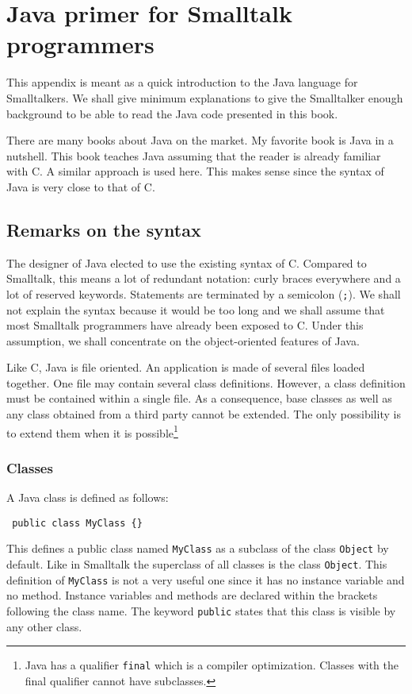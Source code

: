 \documentclass[twoside]{book}
\begin{document}
\fi

\chapter{Java primer for Smalltalk programmers}
\label{ch:javaprimer} This appendix is meant as a quick
introduction to the Java language for Smalltalkers. We shall give
minimum explanations to give the Smalltalker enough background to
be able to read the Java code presented in this book.

There are many books about Java on the market. My favorite book is
Java in a nutshell\cite{Java}. This book teaches Java assuming
that the reader is already familiar with C. A similar approach is
used here. This makes sense since the syntax of Java is very close
to that of C.

\section{Remarks on the syntax}
The designer of Java elected to use the existing syntax of C.
Compared to Smalltalk, this means a lot of redundant notation:
curly braces everywhere and a lot of reserved keywords. Statements
are terminated by a semicolon ({\tt ;}). We shall not explain the
syntax because it would be too long and we shall assume that most
Smalltalk programmers have already been exposed to C. Under this
assumption, we shall concentrate on the object-oriented features
of Java.

Like C, Java is file oriented.  An application is made of several
files loaded together. One file may contain several class
definitions. However, a class definition must be contained within
a single file. As a consequence, base classes as well as any class
obtained from a third party cannot be extended. The only
possibility is to extend them when it is possible\footnote{Java
has a qualifier {\tt final} which is a compiler optimization.
Classes with the final qualifier cannot have subclasses.}

\subsection{Classes}
A Java class is defined as follows:
\begin{verbatim}
 public class MyClass {}
\end{verbatim}
This defines a public class named {\tt MyClass} as a subclass of
the class {\tt Object} by default. Like in Smalltalk the
superclass of all classes is the class {\tt Object}. This
definition of {\tt MyClass} is not a very useful one since it has
no instance variable and no method. Instance variables and methods
are declared within the brackets following the class name. The
keyword {\tt public} states that this class is visible by any
other class.
\end{document}
